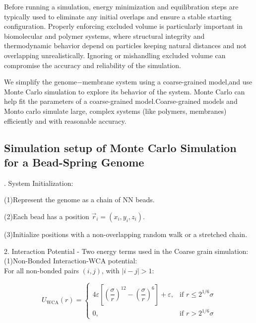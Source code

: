 \documentclass[12pt]{article}
\begin{document}
\begin{flushleft}
Before running a simulation, energy minimization and equilibration steps are typically used to eliminate any initial overlaps and ensure a stable starting configuration. Properly enforcing excluded volume is particularly important in biomolecular and polymer systems, where structural integrity and thermodynamic behavior depend on particles keeping natural distances and not overlapping unrealistically. Ignoring or mishandling excluded volume can compromise the accuracy and reliability of the simulation.



We simplify the genome$-$membrane system using a coarse-grained model,and use Monte Carlo simulation to explore its behavior of the system. Monte Carlo can help fit the parameters of a coarse-grained model.Coarse-grained models and Monto carlo simulate large, complex systems (like polymers, membranes) efficiently and with reasonable accuracy.


\vspace{-1em} 

\subsection*{Simulation setup of Monte Carlo Simulation for a Bead-Spring Genome}
. System Initialization:

\setlength{\parindent}{6em} (1)Represent the genome as a chain of NN beads.

(2)Each bead has a position $\vec{r}_i = (x_i, y_i, z_i)$.

(3)Initialize positions with a non-overlapping random walk or a stretched chain.\\

\setlength{\parindent}{0pt}




2. Interaction Potential - Two energy terms used in the Coarse grain simulation:\\

\setlength{\parindent}{6em}(1)Non-Bonded Interaction-WCA potential:\\
\setlength{\parindent}{0pt}
\setlength{\parindent}{7em}For all non-bonded pairs $(i, j)$, with $|i - j| > 1$:
\setlength{\parindent}{0pt}

\begin{equation}
U_{\text{WCA}}(r) = 
\begin{cases}
4\varepsilon \left[ \left( \dfrac{\sigma}{r} \right)^{12} - \left( \dfrac{\sigma}{r} \right)^6 \right] + \varepsilon, & \text{if } r \leq 2^{1/6} \sigma \\
0, & \text{if } r > 2^{1/6} \sigma
\end{cases}
\end{equation}



\end{flushleft}
\end{document}
